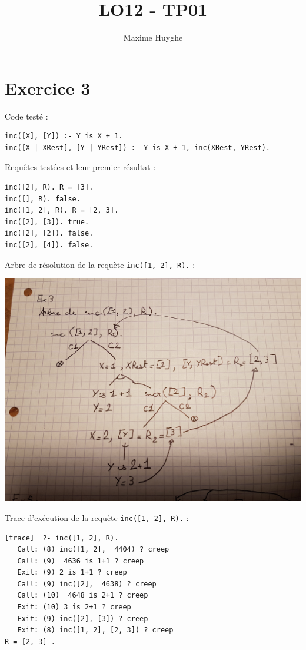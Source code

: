 \documentclass{article}
\title{LO12 - TP01}
\author{Maxime Huyghe}
\begin{document}
\maketitle

\section*{Exercice 3}

Code testé :
\begin{verbatim}
inc([X], [Y]) :- Y is X + 1.
inc([X | XRest], [Y | YRest]) :- Y is X + 1, inc(XRest, YRest).
\end{verbatim}

Requêtes testées et leur premier résultat :
\begin{verbatim}
inc([2], R). R = [3].
inc([], R). false.
inc([1, 2], R). R = [2, 3].
inc([2], [3]). true.
inc([2], [2]). false.
inc([2], [4]). false.
\end{verbatim}

Arbre de résolution de la requète \texttt{inc([1, 2], R).} :

\includegraphics[width=\textwidth]{arbre_ex3}

Trace d'exécution de la requète \texttt{inc([1, 2], R).} :
\begin{verbatim}
[trace]  ?- inc([1, 2], R).
   Call: (8) inc([1, 2], _4404) ? creep
   Call: (9) _4636 is 1+1 ? creep
   Exit: (9) 2 is 1+1 ? creep
   Call: (9) inc([2], _4638) ? creep
   Call: (10) _4648 is 2+1 ? creep
   Exit: (10) 3 is 2+1 ? creep
   Exit: (9) inc([2], [3]) ? creep
   Exit: (8) inc([1, 2], [2, 3]) ? creep
R = [2, 3] .
\end{verbatim}
\end{document}
